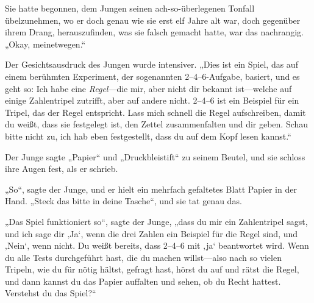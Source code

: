 Sie hatte begonnen, dem Jungen seinen ach-so-überlegenen Tonfall übelzunehmen, wo er doch genau wie sie erst elf Jahre alt war, doch gegenüber ihrem Drang, herauszufinden, was sie falsch gemacht hatte, war das nachrangig. „Okay, meinetwegen.“

Der Gesichtsausdruck des Jungen wurde intensiver. „Dies ist ein Spiel, das auf einem berühmten Experiment, der sogenannten 2–4–6-Aufgabe, basiert, und es geht so: Ich habe eine \emph{Regel}—die mir, aber nicht dir bekannt ist—welche auf einige Zahlentripel zutrifft, aber auf andere nicht. 2–4–6 ist ein Beispiel für ein Tripel, das der Regel entspricht. Lass mich schnell die Regel aufschreiben, damit du weißt, dass sie festgelegt ist, den Zettel zusammenfalten und dir geben. Schau bitte nicht zu, ich hab eben festgestellt, dass du auf dem Kopf lesen kannst.“

Der Junge sagte „Papier“ und „Druckbleistift“ zu seinem Beutel, und sie schloss ihre Augen fest, als er schrieb.

„So“, sagte der Junge, und er hielt ein mehrfach gefaltetes Blatt Papier in der Hand. „Steck das bitte in deine Tasche“, und sie tat genau das.

„Das Spiel funktioniert so“, sagte der Junge, „dass du mir ein Zahlentripel sagst, und ich sage dir ‚Ja‘, wenn die drei Zahlen ein Beispiel für die Regel sind, und ‚Nein‘, wenn nicht. Du weißt bereits, dass 2–4–6 mit ‚ja‘ beantwortet wird. Wenn du alle Tests durchgeführt hast, die du machen willst—also nach so vielen Tripeln, wie du für nötig hältst, gefragt hast, hörst du auf und rätst die Regel, und dann kannst du das Papier auffalten und sehen, ob du Recht hattest. Verstehst du das Spiel?“

